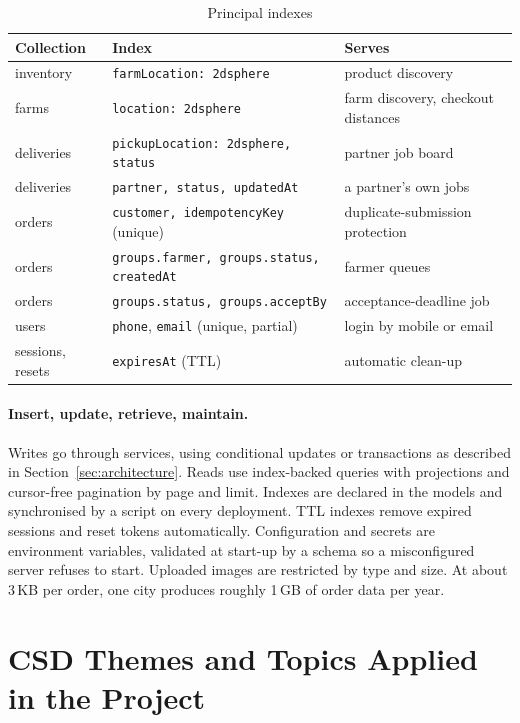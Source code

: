 \documentclass[manuscript,screen,review]{acmart}
\begin{document}
\begin{table}[htbp]
  \caption{Principal indexes}
  \label{tab:indexes}
  \small
  \begin{tabularx}{\columnwidth}{@{}p{}p{}L@{}}
    \toprule
    \textbf{Collection} & \textbf{Index} & \textbf{Serves} \\
    \midrule
    inventory & \texttt{farmLocation: 2dsphere} & product discovery \\
    farms & \texttt{location: 2dsphere} & farm discovery, checkout distances \\
    deliveries & \texttt{pickupLocation: 2dsphere, status} & partner job board \\
    deliveries & \texttt{partner, status, updatedAt} & a partner's own jobs \\
    orders & \texttt{customer, idempotencyKey} (unique) & duplicate-submission protection \\
    orders & \texttt{groups.farmer, groups.status, createdAt} & farmer queues \\
    orders & \texttt{groups.status, groups.acceptBy} & acceptance-deadline job \\
    users & \texttt{phone}, \texttt{email} (unique, partial) & login by mobile or email \\
    sessions, resets & \texttt{expiresAt} (TTL) & automatic clean-up \\
    \bottomrule
  \end{tabularx}
\end{table}

\paragraph{Insert, update, retrieve, maintain.} Writes go through services, using conditional updates or transactions as described in Section~\ref{sec:architecture}. Reads use index-backed queries with projections and cursor-free pagination by page and limit. Indexes are declared in the models and synchronised by a script on every deployment. TTL indexes remove expired sessions and reset tokens automatically. Configuration and secrets are environment variables, validated at start-up by a schema so a misconfigured server refuses to start. Uploaded images are restricted by type and size. At about 3\,KB per order, one city produces roughly 1\,GB of order data per year.

\section{CSD Themes and Topics Applied in the Project}
\label{sec:csd-themes}
\end{document}
